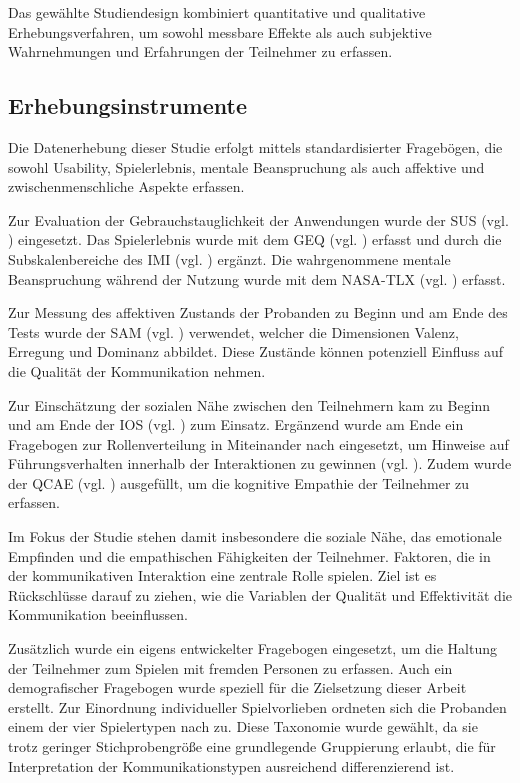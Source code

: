 Das gewählte Studiendesign kombiniert quantitative und qualitative Erhebungsverfahren, um sowohl messbare Effekte als auch subjektive Wahrnehmungen und Erfahrungen der Teilnehmer zu erfassen.

\subsection{Erhebungsinstrumente}

Die Datenerhebung dieser Studie erfolgt mittels standardisierter Fragebögen, die sowohl Usability, Spielerlebnis, mentale Beanspruchung als auch affektive und zwischenmenschliche Aspekte erfassen.

Zur Evaluation der Gebrauchstauglichkeit der Anwendungen wurde der \ac{SUS} (vgl. \citealp{brooke_sus_1995}) eingesetzt. Das Spielerlebnis wurde mit dem \ac{GEQ} (vgl. \citealp{ijsselsteijn_game_2013}) erfasst und durch die Subskalenbereiche  des \ac{IMI} (vgl. \citealp{mcauley_psychometric_1989}) ergänzt. Die wahrgenommene mentale Beanspruchung während der Nutzung wurde mit dem \ac{NASA-TLX} (vgl. \citealp{hart_nasa-task_2006}) erfasst.

Zur Messung des affektiven Zustands der Probanden zu Beginn und am Ende des Tests wurde der \ac{SAM} (vgl. \citealp{russell_evidence_1977}) verwendet, welcher die Dimensionen Valenz, Erregung und Dominanz abbildet. Diese Zustände können potenziell Einfluss auf die Qualität der Kommunikation nehmen.

Zur Einschätzung der sozialen Nähe zwischen den Teilnehmern kam  zu Beginn und am Ende der \ac{IOS} (vgl. \citealp{gachter_measuring_2015}) zum Einsatz. Ergänzend wurde am Ende ein Fragebogen zur Rollenverteilung in Miteinander nach \cite{emmerich_game_2016} eingesetzt, um Hinweise auf Führungsverhalten innerhalb der Interaktionen zu gewinnen (vgl. \citealp[S. 5]{emmerich_game_2016}). Zudem wurde der \ac{QCAE} (vgl. \citealp{reniers_qcae_2011}) ausgefüllt, um die kognitive Empathie der Teilnehmer zu erfassen.

Im Fokus der Studie stehen damit insbesondere die soziale Nähe, das emotionale Empfinden und die empathischen Fähigkeiten der Teilnehmer. Faktoren, die in der kommunikativen Interaktion eine zentrale Rolle spielen. Ziel ist es Rückschlüsse darauf zu ziehen, wie die Variablen der Qualität und Effektivität die Kommunikation beeinflussen.

Zusätzlich wurde ein eigens entwickelter Fragebogen eingesetzt, um die Haltung der Teilnehmer zum Spielen mit fremden Personen zu erfassen. Auch ein demografischer Fragebogen wurde speziell für die Zielsetzung dieser Arbeit erstellt. Zur Einordnung individueller Spielvorlieben ordneten sich die Probanden einem der vier Spielertypen nach  \cite{bartle_hearts_1996} zu. Diese Taxonomie wurde gewählt, da sie trotz geringer Stichprobengröße eine grundlegende Gruppierung erlaubt, die für Interpretation der Kommunikationstypen ausreichend differenzierend ist.

